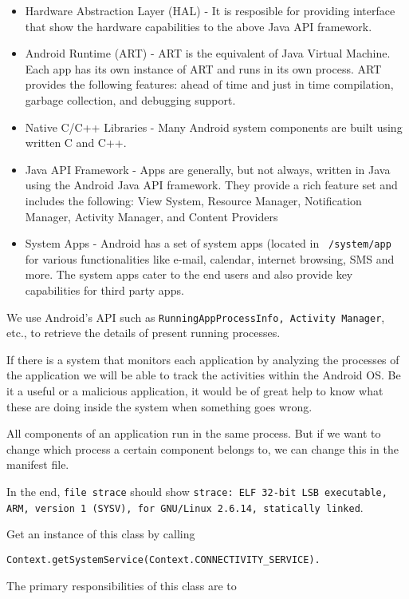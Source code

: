 \begin{itemize}
\item Hardware Abstraction Layer (HAL) - It is resposible for providing
  interface that show the hardware capabilities to the above Java API
  framework.
\item Android Runtime (ART) - ART is the equivalent of Java Virtual
  Machine.  Each app has its own instance of ART and runs in its own
  process.  ART provides the following features:
  ahead of time and just in time compilation,
  garbage collection, and
  debugging support.

\item Native C/C++ Libraries - Many Android system components are
  built using written C and C++.
\item Java API Framework - Apps are generally, but not always, written
  in Java using the Android Java API framework.  They provide a rich
  feature set and includes the following:
  View System,
  Resource Manager,
  Notification Manager,
  Activity Manager, and
  Content Providers

\item System Apps - Android has a set of system apps (located in {\tt
  /system/app} for various functionalities like e-mail, calendar,
  internet browsing, SMS and more.  The system apps cater to the end
  users and also provide key capabilities for third party apps.
\end{itemize}



We use Android's API such as {\tt RunningAppProcessInfo, Activity
  Manager}, etc., to retrieve the details of present running
processes.  


If there is a system that
monitors each application by analyzing the processes of the
application we will be able to track the activities within the Android
OS.  Be it a useful or a malicious application, it would be of great
help to know what these are doing inside the system when something
goes wrong.


All components of an application run in the same process.  But if we
want to change which process a certain component belongs to, we can
change this in the manifest file.

In the end,
{\tt file strace} should show {\tt strace: ELF 32-bit LSB executable,
  ARM, version 1 (SYSV), for GNU/Linux 2.6.14, statically linked}.

Get
an instance of this class by calling
\begin{lstlisting}[breaklines=true]
Context.getSystemService(Context.CONNECTIVITY_SERVICE).
\end{lstlisting}
The primary responsibilities of this class are to

